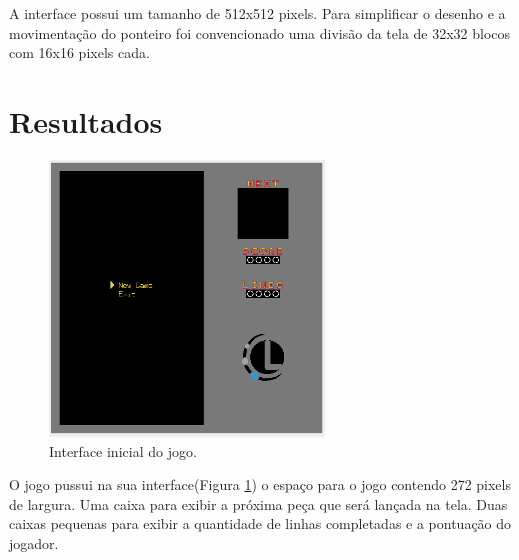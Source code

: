 \documentclass{article}
\begin{document}
A interface possui um tamanho de 512x512 pixels. Para simplificar o desenho e a movimentação do ponteiro foi convencionado uma divisão da tela de 32x32 blocos com 16x16 pixels cada.


\section{Resultados}

\begin{figure}[H]
  \begin{center}
    \includegraphics[width=0.65\textwidth]{images/BaseInterface.png} %
    \caption{Interface inicial do jogo.}
    \label{BaseInterface}
  \end{center}
\end{figure}

O jogo pussui na sua interface(Figura \ref{BaseInterface}) o espaço para o jogo contendo 272 pixels de largura. Uma caixa para exibir a próxima peça que será lançada na tela. Duas caixas pequenas para exibir a quantidade de linhas completadas e a pontuação do jogador.
\end{document}

